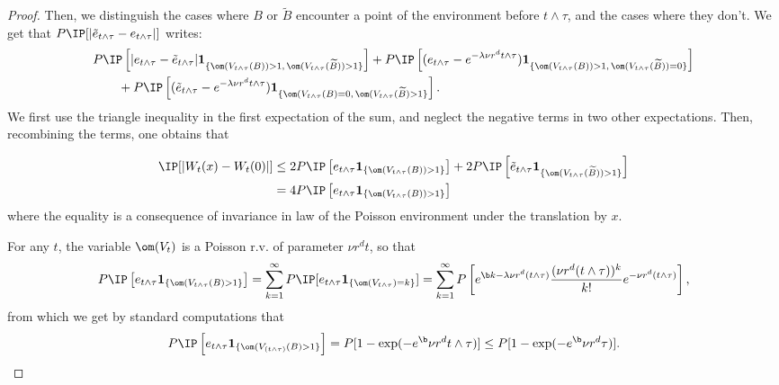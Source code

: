 \begin{proof}
Then, we distinguish the cases where $B$ or $\widetilde{B}$ encounter a point of the environment before $t\wedge \tau$, and the cases where they don't. We get that $P\IP [|\tilde{e}_{t\wedge \tau}-{e}_{t\wedge \tau}|]$ writes:
\begin{align*}
& P\IP \left[|e_{t\wedge \tau} - \tilde{e}_ {t\wedge \tau}| \mathbf{1}_{\{\om(V_{t\wedge \tau}(B))>1,\,\om(V_{t\wedge \tau}( \widetilde B))>1\}}\right] + P\IP\left[(e_{t\wedge \tau} - e^{-\lambda \nu r^d t\wedge \tau}) \mathbf{1}_{\{\om(V_{t\wedge \tau}(B))>1,\,\om(V_{t\wedge \tau}( \widetilde B))=0\}}\right]\\
& \qquad + P\IP\left[(\tilde{e}_{t\wedge \tau} - e^{-\lambda \nu r^d t\wedge \tau}) \mathbf{1}_{\{\om(V_{t\wedge \tau}(B)=0,\,\om(V_{t\wedge \tau}( \widetilde B)>1\}}\right].
\end{align*}
We first use the triangle inequality in the first expectation of the sum, and neglect the negative terms in two other expectations. Then, recombining the terms, one obtains that

\begin{align}
\IP[|W_t(x)-W_t(0)|] & \leq 2 P\IP \left[e_{t\wedge \tau} \mathbf{1}_{\{\om(V_{t\wedge \tau}(B))>1\}}\right] + 2 P\IP \left[\tilde{e}_{t\wedge \tau} \mathbf{1}_{\{\om(V_{t\wedge \tau}(\widetilde{B}))>1\}}\right] \nonumber \\ 
& = 4 P\IP \left[e_{t\wedge \tau} \mathbf{1}_{\{\om(V_{t\wedge \tau}(B))>1\}}\right]  \label{eq:ineqInLemmaWtx}
\end{align}
where the equality is a consequence of invariance in law of the Poisson environment under the translation by $x$.

For any $t$, the variable $\om(V_t)$ is a Poisson r.v. of parameter $ \nu r^d t$, so that
\begin{equation*}
P\IP \left[e_{t\wedge\tau} \mathbf{1}_{\{\om(V_{t\wedge\tau}(B)>1\}}\right]  = \sum_{k=1}^\infty P \IP [e_{t\wedge\tau} \mathbf{1}_{\{\om(V_{t\wedge\tau})=k\}}]
 = \sum_{k=1}^\infty P \left[e^{\b k-\lambda\nu r^d (t\wedge\tau)} \frac{(\nu r^d (t\wedge\tau))^k}{k!}e^{-\nu r^d (t\wedge\tau)} \right],
\end{equation*}
from which we get by standard computations that
\begin{equation} \label{eq:expecInLemmaWtx}
P\IP \left[e_{t\wedge\tau} \mathbf{1}_{\{\om(V_{(t\wedge\tau)}(B)>1\}}\right] = P[1-\exp(-e^\b \nu r^d t\wedge\tau)] \leq P[1-\exp(-e^\b \nu r^d \tau)].\end{equation}


\end{proof}
